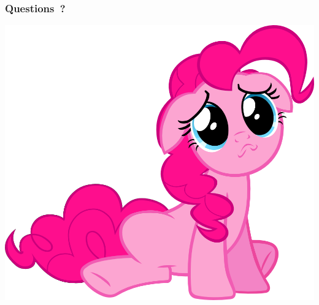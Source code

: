 \documentclass[frenchb,francais]{beamer}
\begin{document}
\begin{frame}
\frametitle{Questions ?}
\begin{center}\includegraphics[scale=.40]{img/questions.png}\end{center}
\end{frame}
\end{document}
